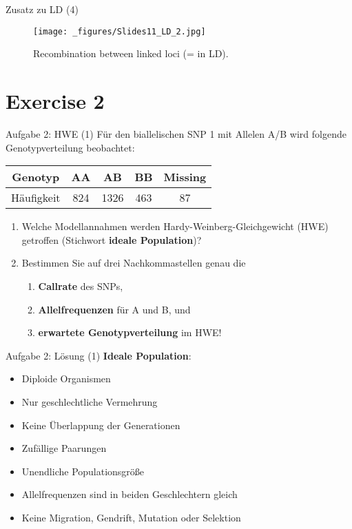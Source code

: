 \documentclass{beamer}
\begin{document}
\begin{frame}{Zusatz zu LD (4)}
\begin{figure}[h]
\begin{center}
\texttt{[image: \_figures/Slides11\_LD\_2.jpg]}
\caption{Recombination between linked loci (= in LD).}
\label{fig:LD2}
\end{center}
\end{figure}
\end{frame}

\section{Exercise 2}

\begin{frame}{Aufgabe 2: HWE (1)}
Für den biallelischen SNP 1 mit Allelen A/B wird folgende Genotypverteilung beobachtet:

\begin{table}[here]
\begin{center}
\begin{tabular}[h]{ccccc}
Genotyp & AA & AB & BB & Missing \\
\hline
Häufigkeit & 824 & 1326 & 463 & 87\\
\end{tabular}
\end{center}
\end{table}

\begin{enumerate}
    \item Welche Modellannahmen werden Hardy-Weinberg-Gleichgewicht (HWE) getroffen (Stichwort \textbf{ideale Population})?
    \item Bestimmen Sie auf drei Nachkommastellen genau die 
    \begin{enumerate}
        \item \textbf{Callrate} des SNPs,
        \item \textbf{Allelfrequenzen} für A und B, und 
        \item \textbf{erwartete Genotypverteilung} im HWE!
    \end{enumerate}
\end{enumerate}
\end{frame}

\begin{frame}{Aufgabe 2: Lösung (1)}
\textbf{Ideale Population}:

\begin{itemize}
    \item Diploide Organismen
    \item Nur geschlechtliche Vermehrung
    \item Keine Überlappung der Generationen
    \item Zufällige Paarungen
    \item Unendliche Populationsgröße
    \item Allelfrequenzen sind in beiden Geschlechtern gleich
    \item Keine Migration, Gendrift, Mutation oder Selektion
\end{itemize}
\end{frame}
\end{document}
